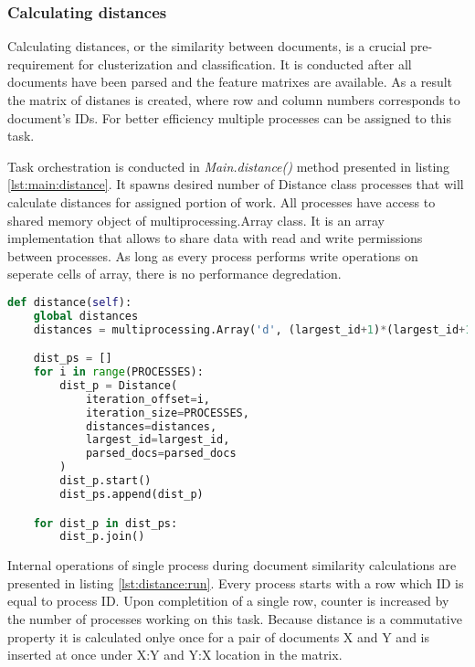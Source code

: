 \subsubsection{Calculating distances}
Calculating distances, or the similarity between documents, is a crucial pre-requirement for clusterization and classification. It is conducted after all documents have been parsed and the feature matrixes are available. As a result the matrix of distanes is created, where row and column numbers corresponds to document's IDs. For better efficiency multiple processes can be assigned to this task.

Task orchestration is conducted in \textit{Main.distance()} method presented in listing \ref{lst:main:distance}. It spawns desired number of Distance class processes that will calculate distances for assigned portion of work. All processes have access to shared memory object of multiprocessing.Array class. It is an array implementation that allows to share data with read and write permissions between processes. As long as every process performs write operations on seperate cells of array, there is no performance degredation.

\begin{lstlisting}[language=Python, caption={Main.distance() - Main process method for conducting distance calculations}, label={lst:main:distance}]
def distance(self):
    global distances
    distances = multiprocessing.Array('d', (largest_id+1)*(largest_id+1))

    dist_ps = []
    for i in range(PROCESSES):
        dist_p = Distance(
            iteration_offset=i,
            iteration_size=PROCESSES,
            distances=distances,
            largest_id=largest_id,
            parsed_docs=parsed_docs
        )
        dist_p.start()
        dist_ps.append(dist_p)

    for dist_p in dist_ps:
        dist_p.join()
\end{lstlisting}

Internal operations of single process during document similarity calculations are presented in listing \ref{lst:distance:run}. Every process starts with a row which ID is equal to process ID. Upon completition of a single row, counter is increased by the number of processes working on this task. Because distance is a commutative property it is calculated onlye once for a pair of documents X and Y and is inserted at once under X:Y and Y:X location in the matrix. 

